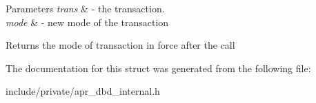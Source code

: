 \begin{DoxyParams}{Parameters}
{\em trans} & -\/ the transaction. \\
\hline
{\em mode} & -\/ new mode of the transaction \\
\hline
\end{DoxyParams}
\begin{DoxyReturn}{Returns}
the mode of transaction in force after the call 
\end{DoxyReturn}


The documentation for this struct was generated from the following file\-:\begin{DoxyCompactItemize}
\item 
include/private/apr\-\_\-dbd\-\_\-internal.\-h\end{DoxyCompactItemize}
